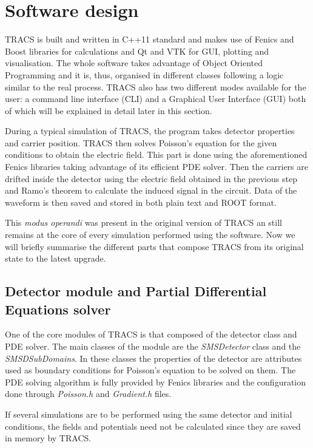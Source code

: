 \section{Software design} %
\label{sec:softDesign}

TRACS is built and written in C++11 standard and makes use of Fenics and Boost libraries for calculations and Qt and VTK for GUI, plotting and visualisation. The whole software takes advantage of Object Oriented Programming and it is, thus, organised in different classes following a logic similar to the real process. TRACS also has two different modes available for the user: a command line interface (CLI) and a Graphical User Interface (GUI) both of which will be explained in detail later in this section.

During a typical simulation of TRACS, the program takes detector properties and carrier position. TRACS then solves Poisson's equation for the given conditions to obtain the electric field. This part is done using the aforementioned Fenics libraries taking advantage of its efficient PDE solver. Then the carriers are drifted inside the detector using the electric field obtained in the previous step and Ramo's theorem to calculate the induced signal in the circuit. Data of the waveform is then saved and stored in both plain text and ROOT format.

This \textit{modus operandi} was present in the original version of TRACS an still remains at the core of every simulation performed using the software. Now we will briefly summarise the different parts that compose TRACS from its original state to the latest upgrade.

\subsection{Detector module and Partial Differential Equations solver}

One of the core modules of TRACS is that composed of the detector class and PDE solver. The main classes of the module are the \textit{SMSDetector} class and the \textit{SMSDSubDomains}. In these classes the properties of the detector are attributes used as boundary conditions for Poisson's equation to be solved on them. The PDE solving algorithm is fully provided by Fenics libraries and the configuration done through \textit{Poisson.h} and \textit{Gradient.h} files.

If several simulations are to be performed using the same detector and initial conditions, the fields and potentials need not be calculated since they are saved in memory by TRACS. 

